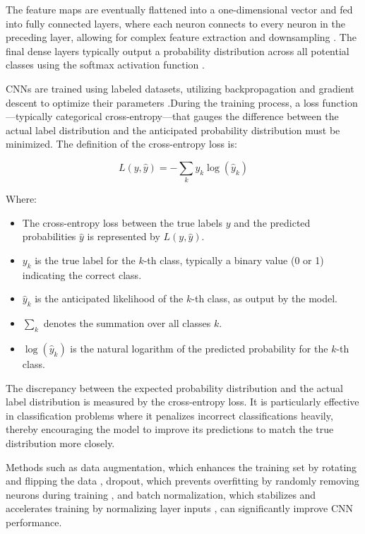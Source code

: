 \documentclass[journal,article,submit,pdftex,moreauthors]{Definitions/mdpi}
\begin{document}
The feature maps are eventually flattened into a one-dimensional vector and fed into fully connected layers, where each neuron connects to every neuron in the preceding layer, allowing for complex feature extraction and downsampling \cite{goodfellow2016deep}. The final dense layers typically output a probability distribution across all potential classes using the softmax activation function \cite{ioffe2015batch}.

CNNs are trained using labeled datasets, utilizing backpropagation and gradient descent to optimize their parameters \cite{ruder2016overview}.During the training process, a loss function—typically categorical cross-entropy—that gauges the difference between the actual label distribution and the anticipated probability distribution must be minimized. The definition of the cross-entropy loss is:

\begin{equation}
    L(y, \hat{y}) = -\sum_{k} y_k \log(\hat{y}_k)
\end{equation}

Where:

\begin{itemize}
  \item The cross-entropy loss between the true labels \(y\) and the predicted probabilities \(\hat{y}\) is represented by \(L(y, \hat{y})\).
  \item \(y_k\) is the true label for the \(k\)-th class, typically a binary value (0 or 1) indicating the correct class.
  \item \(\hat{y}_k\) is the anticipated likelihood of the \(k\)-th class, as output by the model.
  \item \(\sum_{k}\) denotes the summation over all classes \(k\).
  \item \(\log(\hat{y}_k)\) is the natural logarithm of the predicted probability for the \(k\)-th class.
\end{itemize}

The discrepancy between the expected probability distribution and the actual label distribution is measured by the cross-entropy loss. It is particularly effective in classification problems where it penalizes incorrect classifications heavily, thereby encouraging the model to improve its predictions to match the true distribution more closely.

Methods such as data augmentation, which enhances the training set by rotating and flipping the data \cite{shorten2019survey}, dropout, which prevents overfitting by randomly removing neurons during training \cite{srivastava2014dropout}, and batch normalization, which stabilizes and accelerates training by normalizing layer inputs \cite{ioffe2015batch}, can significantly improve CNN performance.
\end{document}
